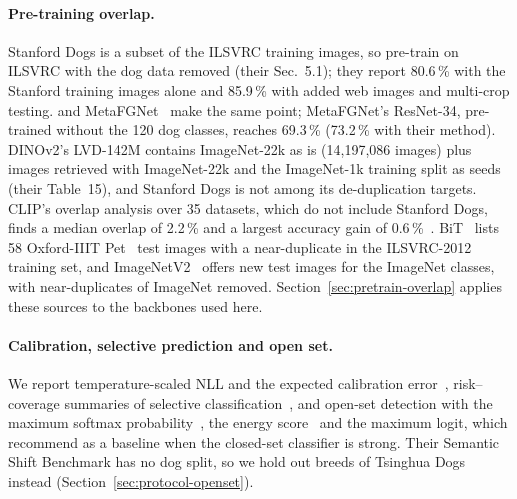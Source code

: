 \documentclass[11pt,a4paper]{article}
\theoremstyle{plain}
\begin{document}
\paragraph{Pre-training overlap.}
Stanford Dogs is a subset of the ILSVRC training images, so \citet{krause2016unreasonable} pre-train on ILSVRC with
the dog data removed (their Sec.~5.1); they report 80.6\,\% with the Stanford training images alone and 85.9\,\% with
added web images and multi-crop testing. \citet{murabito2018saliency} and MetaFGNet~\citep{zhang2018metafgnet} make
the same point; MetaFGNet's ResNet-34, pre-trained without the 120 dog classes, reaches 69.3\,\% (73.2\,\% with
their method). DINOv2's LVD-142M contains ImageNet-22k as is (14,197,086 images) plus images retrieved with
ImageNet-22k and the ImageNet-1k training split as seeds (their Table~15), and Stanford Dogs is not among its
de-duplication targets. CLIP's overlap analysis over 35 datasets, which do not include Stanford Dogs, finds a median
overlap of 2.2\,\% and a largest accuracy gain of 0.6\,\%~\citep{radford2021clip}. BiT~\citep{kolesnikov2020bit}
lists 58 Oxford-IIIT Pet~\citep{parkhi2012catsdogs} test images with a near-duplicate in the ILSVRC-2012 training set,
and ImageNetV2~\citep{recht2019imagenetv2} offers new test images for the ImageNet classes, with near-duplicates of
ImageNet removed. Section~\ref{sec:pretrain-overlap} applies these sources to the backbones used here.

\paragraph{Calibration, selective prediction and open set.}
We report temperature-scaled NLL and the expected calibration error~\citep{guo2017calibration,naeini2015bbq},
risk--coverage summaries of selective classification~\citep{geifman2017selective}, and open-set detection with the
maximum softmax probability~\citep{hendrycks2017msp}, the energy score~\citep{liu2020energy} and the maximum logit,
which \citet{vaze2022openset} recommend as a baseline when the closed-set classifier is strong. Their Semantic Shift
Benchmark has no dog split, so we hold out breeds of Tsinghua Dogs instead (Section~\ref{sec:protocol-openset}).
\end{document}
